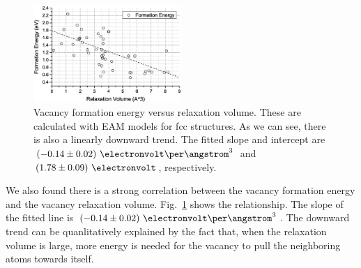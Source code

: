 \documentclass[%
 reprint,
 amsmath,amssymb,
 aps,
]{revtex4-1}
\begin{document}
\begin{figure}
\centering
\includegraphics[width=0.5\textwidth, clip, trim = 10mm 3mm 10mm 10mm]{vfe_vs_vrv}%
\caption{\label{fig:vfevsvrv}
Vacancy formation energy versus relaxation volume.
These are calculated with EAM models for fcc structures.
As we can see, there is also a linearly downward trend.
The fitted slope and intercept are $(-0.14\pm0.02)~\electronvolt\per\angstrom^3$ and $(1.78\pm0.09)~\electronvolt$, respectively.
}
\end{figure}

We also found there is a strong correlation between the vacancy formation energy and the vacancy relaxation volume.
Fig.~\ref{fig:vfevsvrv} shows the relationship.
The slope of the fitted line is $(-0.14\pm0.02)~\electronvolt\per\angstrom^3$.
The downward trend can be quanlitatively explained by the fact that, when the relaxation volume is large, more energy is needed for the vacancy to pull the neighboring atoms towards itself.


%
%
%
\end{document}
